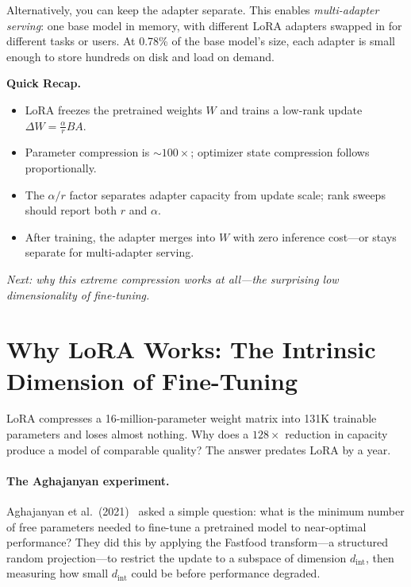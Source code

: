 Alternatively, you can keep the adapter separate. This enables \emph{multi-adapter serving}: one base model in memory, with different LoRA adapters swapped in for different tasks or users. At 0.78\% of the base model's size, each adapter is small enough to store hundreds on disk and load on demand.

\begin{quickrecap}
\textbf{Quick Recap.}
\begin{itemize}[nosep,leftmargin=1.5em]
  \item LoRA freezes the pretrained weights $W$ and trains a low-rank update $\Delta W = \frac{\alpha}{r} BA$.
  \item Parameter compression is $\sim$$100\times$; optimizer state compression follows proportionally.
  \item The $\alpha/r$ factor separates adapter capacity from update scale; rank sweeps should report both $r$ and $\alpha$.
  \item After training, the adapter merges into $W$ with zero inference cost---or stays separate for multi-adapter serving.
\end{itemize}
\textit{Next: why this extreme compression works at all---the surprising low dimensionality of fine-tuning.}
\end{quickrecap}


\section{Why LoRA Works: The Intrinsic Dimension of Fine-Tuning}
\label{sec:lora-why}

LoRA compresses a 16-million-parameter weight matrix into 131K trainable parameters and loses almost nothing. Why does a $128\times$ reduction in capacity produce a model of comparable quality? The answer predates LoRA by a year.

\paragraph{The Aghajanyan experiment.} Aghajanyan et al.\ (2021)~\cite{aghajanyan2021intrinsic} asked a simple question: what is the minimum number of free parameters needed to fine-tune a pretrained model to near-optimal performance? They did this by applying the Fastfood transform---a structured random projection---to restrict the update to a subspace of dimension $d_{\text{int}}$, then measuring how small $d_{\text{int}}$ could be before performance degraded.

